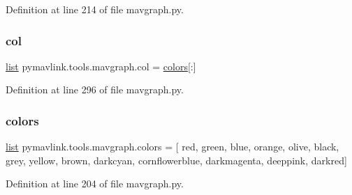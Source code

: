 Definition at line 214 of file mavgraph.\+py.

\mbox{\label{namespacepymavlink_1_1tools_1_1mavgraph_af6bb70f02b9d6d3eaab8b0a303c984ed}} 
\subsubsection{\texorpdfstring{col}{col}}
{\footnotesize\ttfamily \mbox{\hyperlink{structlist}{list}} pymavlink.\+tools.\+mavgraph.\+col = \mbox{\hyperlink{namespacepymavlink_1_1tools_1_1mavgraph_a19862d005460bc9f0c104743009a0ff1}{colors}}\mbox{[}\+:\mbox{]}}



Definition at line 296 of file mavgraph.\+py.

\mbox{\label{namespacepymavlink_1_1tools_1_1mavgraph_a19862d005460bc9f0c104743009a0ff1}} 
\subsubsection{\texorpdfstring{colors}{colors}}
{\footnotesize\ttfamily \mbox{\hyperlink{structlist}{list}} pymavlink.\+tools.\+mavgraph.\+colors = \mbox{[} \textquotesingle{}red\textquotesingle{}, \textquotesingle{}green\textquotesingle{}, \textquotesingle{}blue\textquotesingle{}, \textquotesingle{}orange\textquotesingle{}, \textquotesingle{}olive\textquotesingle{}, \textquotesingle{}black\textquotesingle{}, \textquotesingle{}grey\textquotesingle{}, \textquotesingle{}yellow\textquotesingle{}, \textquotesingle{}brown\textquotesingle{}, \textquotesingle{}darkcyan\textquotesingle{}, \textquotesingle{}cornflowerblue\textquotesingle{}, \textquotesingle{}darkmagenta\textquotesingle{}, \textquotesingle{}deeppink\textquotesingle{}, \textquotesingle{}darkred\textquotesingle{}\mbox{]}}



Definition at line 204 of file mavgraph.\+py.

\mbox{\label{namespacepymavlink_1_1tools_1_1mavgraph_a327046b2526de86104baff4ee12491b6}} 
